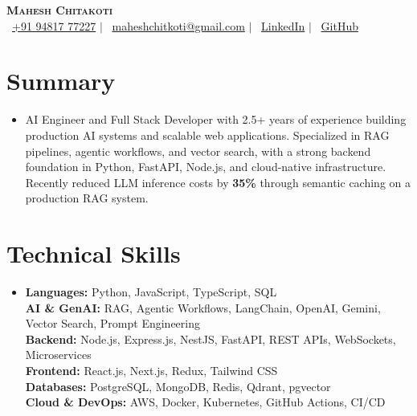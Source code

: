 \documentclass[letterpaper,10pt]{article}
\begin{document}
\enlargethispage{2\baselineskip}

\begin{center}
    \textbf{\Huge \scshape Mahesh Chitakoti} \\ \vspace{1pt}
    \small \faPhone\, \href{tel:+919481777227}{+91 94817 77227} $|$
    \faEnvelope\, \href{mailto:maheshchitkoti@gmail.com}{maheshchitkoti@gmail.com} $|$
    \faLinkedin\, \href{https://linkedin.com/in/maheshchitakoti}{LinkedIn} $|$
    \faGithub\, \href{https://github.com/maheshchichkoti}{GitHub}
\end{center}

\section{Summary}
\begin{itemize}[leftmargin=0.15in, label={}]
  \item \small{AI Engineer and Full Stack Developer with 2.5+ years of experience building production AI systems and scalable web applications. Specialized in RAG pipelines, agentic workflows, and vector search, with a strong backend foundation in Python, FastAPI, Node.js, and cloud-native infrastructure. Recently reduced LLM inference costs by \textbf{35\%} through semantic caching on a production RAG system.}
\end{itemize}

\section{Technical Skills}
\begin{itemize}[leftmargin=0.15in, label={}, itemsep=2pt]
\item{
\textbf{Languages:} Python, JavaScript, TypeScript, SQL \\
\textbf{AI \& GenAI:} RAG, Agentic Workflows, LangChain, OpenAI, Gemini, Vector Search, Prompt Engineering \\
\textbf{Backend:} Node.js, Express.js, NestJS, FastAPI, REST APIs, WebSockets, Microservices \\
\textbf{Frontend:} React.js, Next.js, Redux, Tailwind CSS \\
\textbf{Databases:} PostgreSQL, MongoDB, Redis, Qdrant, pgvector \\
\textbf{Cloud \& DevOps:} AWS, Docker, Kubernetes, GitHub Actions, CI/CD
}
\end{itemize}
\end{document}
